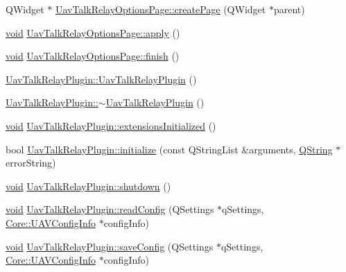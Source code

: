 \begin{DoxyCompactItemize}
\item 
\-Q\-Widget $\ast$ \hyperlink{group___u_a_v_talk_ga07ae0ea88536d2fd82f9f9ddb84cb3cc}{\-Uav\-Talk\-Relay\-Options\-Page\-::create\-Page} (\-Q\-Widget $\ast$parent)
\item 
\hyperlink{group___u_a_v_objects_plugin_ga444cf2ff3f0ecbe028adce838d373f5c}{void} \hyperlink{group___u_a_v_talk_gac14cce3fcdf4dc493bfc8777032d1b41}{\-Uav\-Talk\-Relay\-Options\-Page\-::apply} ()
\item 
\hyperlink{group___u_a_v_objects_plugin_ga444cf2ff3f0ecbe028adce838d373f5c}{void} \hyperlink{group___u_a_v_talk_ga3c6b3400f3c46755bcc572ba5b76e9af}{\-Uav\-Talk\-Relay\-Options\-Page\-::finish} ()
\item 
\hyperlink{group___u_a_v_talk_ga425fbe805214fb0a0ec2eb24f6bf0af4}{\-Uav\-Talk\-Relay\-Plugin\-::\-Uav\-Talk\-Relay\-Plugin} ()
\item 
\hyperlink{group___u_a_v_talk_gaad7159b5c609edca5e23031119f623c7}{\-Uav\-Talk\-Relay\-Plugin\-::$\sim$\-Uav\-Talk\-Relay\-Plugin} ()
\item 
\hyperlink{group___u_a_v_objects_plugin_ga444cf2ff3f0ecbe028adce838d373f5c}{void} \hyperlink{group___u_a_v_talk_ga23c510f5254ca286083d1b3e4a732582}{\-Uav\-Talk\-Relay\-Plugin\-::extensions\-Initialized} ()
\item 
bool \hyperlink{group___u_a_v_talk_gacb02c97b971babafb922150887825934}{\-Uav\-Talk\-Relay\-Plugin\-::initialize} (const \-Q\-String\-List \&arguments, \hyperlink{group___u_a_v_objects_plugin_gab9d252f49c333c94a72f97ce3105a32d}{\-Q\-String} $\ast$error\-String)
\item 
\hyperlink{group___u_a_v_objects_plugin_ga444cf2ff3f0ecbe028adce838d373f5c}{void} \hyperlink{group___u_a_v_talk_ga2a3c3d63a751ae8931cfbd8cf30792ba}{\-Uav\-Talk\-Relay\-Plugin\-::shutdown} ()
\item 
\hyperlink{group___u_a_v_objects_plugin_ga444cf2ff3f0ecbe028adce838d373f5c}{void} \hyperlink{group___u_a_v_talk_ga56f6231aec2bb6b547cd07b4533cb949}{\-Uav\-Talk\-Relay\-Plugin\-::read\-Config} (\-Q\-Settings $\ast$q\-Settings, \hyperlink{class_core_1_1_u_a_v_config_info}{\-Core\-::\-U\-A\-V\-Config\-Info} $\ast$config\-Info)
\item 
\hyperlink{group___u_a_v_objects_plugin_ga444cf2ff3f0ecbe028adce838d373f5c}{void} \hyperlink{group___u_a_v_talk_ga36180ad0b7197a844dfe5ff50a116aa1}{\-Uav\-Talk\-Relay\-Plugin\-::save\-Config} (\-Q\-Settings $\ast$q\-Settings, \hyperlink{class_core_1_1_u_a_v_config_info}{\-Core\-::\-U\-A\-V\-Config\-Info} $\ast$config\-Info)
\end{DoxyCompactItemize}
